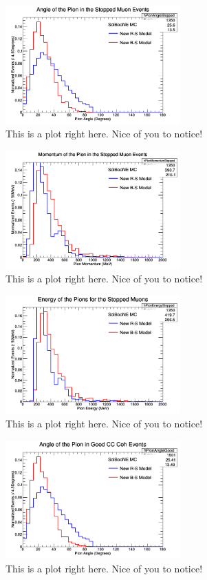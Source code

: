 \documentclass[11pt]{article}
\begin{document}
\begin{figure}[H]
\centering
\includegraphics[width=0.6\textwidth]{ANMPionPlottingImages/4-ANMPionPlotting.png}
\caption{This is a plot right here. Nice of you to notice!}
\end{figure}

\begin{figure}[H]
\centering
\includegraphics[width=0.6\textwidth]{ANMPionPlottingImages/5-ANMPionPlotting.png}
\caption{This is a plot right here. Nice of you to notice!}
\end{figure}

\begin{figure}[H]
\centering
\includegraphics[width=0.6\textwidth]{ANMPionPlottingImages/6-ANMPionPlotting.png}
\caption{This is a plot right here. Nice of you to notice!}
\end{figure}

\begin{figure}[H]
\centering
\includegraphics[width=0.6\textwidth]{ANMPionPlottingImages/7-ANMPionPlotting.png}
\caption{This is a plot right here. Nice of you to notice!}
\end{figure}
\end{document}
